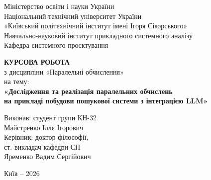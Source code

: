 \documentclass[14pt,a4paper]{extarticle}
\begin{document}
\begin{titlepage}
\begin{singlespace}
\centering
Міністерство освіти і науки України\\
Національний технічний університет України\\
«Київський політехнічний інститут імені Ігоря Сікорського»\\
Навчально-науковий інститут прикладного системного аналізу\\
Кафедра системного проєктування

\vspace{55mm}
{\bfseries КУРСОВА РОБОТА}\\[4mm]
з дисципліни «Паралельні обчислення»\\[2mm]
на тему:\\[2mm]
{\bfseries «Дослідження та реалізація паралельних обчислень\\
на прикладі побудови пошукової системи з інтеграцією LLM»}

\vspace{40mm}
\begin{flushright}
\begin{minipage}{0.55\textwidth}
Виконав: студент групи КН-32\\
Майстренко Ілля Ігорович\\[6mm]
Керівник: доктор філософії,\\ ст. викладач кафедри СП\\
Яременко Вадим Сергійович
\end{minipage}
\end{flushright}

\vfill
Київ – 2026
\end{singlespace}
\end{titlepage}
\setcounter{page}{2}

\tableofcontents








\end{document}
